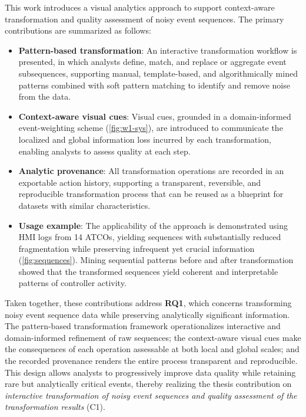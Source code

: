 This work introduces a visual analytics approach to support context-aware transformation and quality assessment of noisy event sequences.
The primary contributions are summarized as follows:
\begin{itemize}
    \item 
    \textbf{Pattern-based transformation}: 
    An interactive transformation workflow is presented, in which analysts define, match, and replace or aggregate event subsequences, supporting manual, template-based, and algorithmically mined patterns combined with soft pattern matching to identify and remove noise from the data.
    
    \item 
    \textbf{Context-aware visual cues}: 
    Visual cues, grounded in a domain-informed event-weighting scheme (\cref{fig:w1-sys}), are introduced to communicate the localized and global information loss incurred by each transformation, enabling analysts to assess quality at each step.

    \item
    \textbf{Analytic provenance}: 
    All transformation operations are recorded in an exportable action history, supporting a transparent, reversible, and reproducible transformation process that can be reused as a blueprint for datasets with similar characteristics.

    \item
    \textbf{Usage example}:
    The applicability of the approach is demonstrated using HMI logs from 14 ATCOs, yielding sequences with substantially reduced fragmentation while preserving infrequent yet crucial information (\cref{fig:sequences}).
    Mining sequential patterns before and after transformation showed that the transformed sequences yield coherent and interpretable patterns of controller activity.
\end{itemize}

Taken together, these contributions address \textbf{RQ1}, which concerns transforming noisy event sequence data while preserving analytically significant information.
The pattern-based transformation framework operationalizes interactive and domain-informed refinement of raw sequences; the context-aware visual cues make the consequences of each operation assessable at both local and global scales; and the recorded provenance renders the entire process transparent and reproducible.
This design allows analysts to progressively improve data quality while retaining rare but analytically critical events, thereby realizing the thesis contribution on \textit{interactive transformation of noisy event sequences and quality assessment of the transformation results} (C1).

